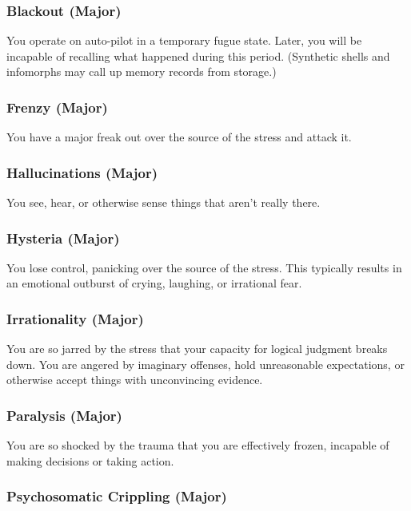 \subsubsection{Blackout (Major)}

You operate on auto-pilot in a temporary fugue state. 
Later, you will be incapable of recalling what happened
during this period. (Synthetic shells and infomorphs
may call up memory records from storage.)

\subsubsection{Frenzy (Major)}

You have a major freak out over the source of the 
stress and attack it.

\subsubsection{Hallucinations (Major)}

You see, hear, or otherwise sense things that aren't 
really there.

\subsubsection{Hysteria (Major)}

You lose control, panicking over the source of the 
stress. This typically results in an emotional outburst 
of crying, laughing, or irrational fear.

\subsubsection{Irrationality (Major)}

You are so jarred by the stress that your capacity for 
logical judgment breaks down. You are angered by 
imaginary offenses, hold unreasonable expectations, or 
otherwise accept things with unconvincing evidence.

\subsubsection{Paralysis (Major)}

You are so shocked by the trauma that you are effectively
frozen, incapable of making decisions or taking
action.

\subsubsection{Psychosomatic Crippling (Major)}

